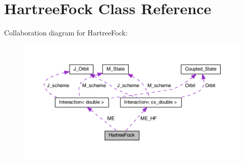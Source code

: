 \hypertarget{class_hartree_fock}{\section{Hartree\-Fock Class Reference}
\label{class_hartree_fock}
}


Collaboration diagram for Hartree\-Fock\-:
\nopagebreak
\begin{figure}[H]
\begin{center}
\leavevmode
\includegraphics[width=350pt]{class_hartree_fock__coll__graph}
\end{center}
\end{figure}

